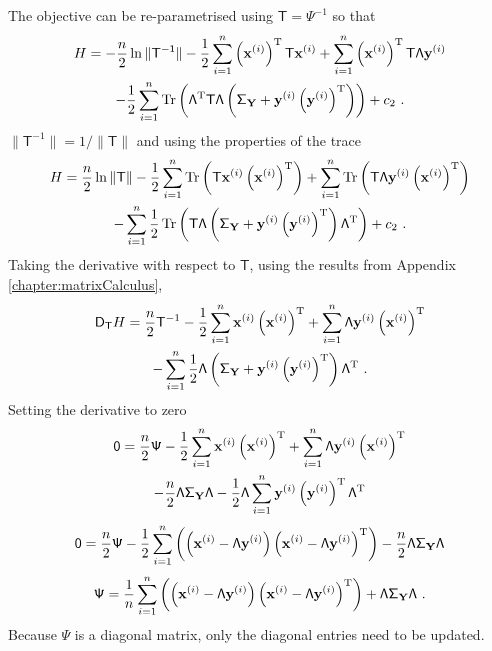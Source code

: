 \documentclass[12pt]{report}
\DeclareMathOperator{\trace}{Tr}
\newcommand{\T}{^\textup{T}}
\newcommand{\vect}[1]{\mathbf{#1}}
\newcommand{\matr}[1]{\mathsf{#1}}
\begin{document}
The objective can be re-parametrised using $\matr{T}=\matr{\Psi}^{-1}$ so that
\begin{multline*}
H = -\frac{n}{2}
\ln\|\matr{T^{-1}}\|
-\frac{1}{2}\sum_{i=1}^{n}\left(\vect{x}^{(i)}\right)\T\matr{T}\vect{x}^{(i)}
+\sum_{i=1}^{n}\left(\vect{x}^{(i)}\right)\T\matr{T}\matr{\Lambda}\vect{y}^{(i)}\\
-\frac{1}{2}\sum_{i=1}^{n}\trace\left(\matr{\Lambda}\T\matr{T}\matr{\Lambda}\left(\matr{\Sigma}_{\vect{Y}}+\vect{y}^{(i)}\left(\vect{y}^{(i)}\right)\T\right)\right)
+c_2 \ .
\end{multline*}
$\|\matr{T}^{-1}\| = 1/\|\matr{T}\|$ and using the properties of the trace
\begin{multline*}
H = \frac{n}{2}
\ln\|\matr{T}\|
-\frac{1}{2}\sum_{i=1}^{n}\trace\left(\matr{T}\vect{x}^{(i)}\left(\vect{x}^{(i)}\right)\T\right)
+\sum_{i=1}^{n}\trace\left(\matr{T}\matr{\Lambda}\vect{y}^{(i)}\left(\vect{x}^{(i)}\right)\T\right)\\
-\sum_{i=1}^{n}\frac{1}{2}\trace\left(\matr{T}\matr{\Lambda}\left(\matr{\Sigma}_{\vect{Y}}+\vect{y}^{(i)}\left(\vect{y}^{(i)}\right)\T\right)\matr{\Lambda}\T\right)
+c_2 \ .
\end{multline*}
Taking the derivative with respect to $\matr{T}$, using the results from Appendix \ref{chapter:matrixCalculus},
\begin{multline*}
\matr{D}_{\matr{T}}H = \frac{n}{2}\matr{T}^{-1}
-\frac{1}{2}\sum_{i=1}^{n}\vect{x}^{(i)}\left(\vect{x}^{(i)}\right)\T
+\sum_{i=1}^{n}\matr{\Lambda}\vect{y}^{(i)}\left(\vect{x}^{(i)}\right)\T\\
-\sum_{i=1}^{n}\frac{1}{2}\matr{\Lambda}\left(\matr{\Sigma}_{\vect{Y}}+\vect{y}^{(i)}\left(\vect{y}^{(i)}\right)\T\right)\matr{\Lambda}\T \ .
\end{multline*}
Setting the derivative to zero
\begin{multline*}
\matr{0} = \frac{n}{2}\matr{\Psi}
-\frac{1}{2}\sum_{i=1}^{n}\vect{x}^{(i)}\left(\vect{x}^{(i)}\right)\T
+\sum_{i=1}^{n}\matr{\Lambda}\vect{y}^{(i)}\left(\vect{x}^{(i)}\right)\T\\
-\frac{n}{2}\matr{\Lambda}\matr{\Sigma}_{\vect{Y}}\matr{\Lambda}-\frac{1}{2}\matr{\Lambda}\sum_{i=1}^{n}\vect{y}^{(i)}\left(\vect{y}^{(i)}\right)\T\matr{\Lambda}\T
\end{multline*}
\begin{equation*}
\matr{0} = \frac{n}{2}\matr{\Psi}
-\frac{1}{2}\sum_{i=1}^{n}\left(
\left(\vect{x}^{(i)}-\matr{\Lambda}\vect{y}^{(i)}\right)
\left(\vect{x}^{(i)}-\matr{\Lambda}\vect{y}^{(i)}\right)\T
\right)
-\frac{n}{2}\matr{\Lambda}\matr{\Sigma}_{\vect{Y}}\matr{\Lambda}
\end{equation*}
\begin{equation}
\matr{\Psi} =
\frac{1}{n}\sum_{i=1}^{n}\left(
\left(\vect{x}^{(i)}-\matr{\Lambda}\vect{y}^{(i)}\right)
\left(\vect{x}^{(i)}-\matr{\Lambda}\vect{y}^{(i)}\right)\T
\right)
+\matr{\Lambda}\matr{\Sigma}_{\vect{Y}}\matr{\Lambda}\ .
\end{equation}
Because $\matr{\Psi}$ is a diagonal matrix, only the diagonal entries need to be updated.
\end{document}
